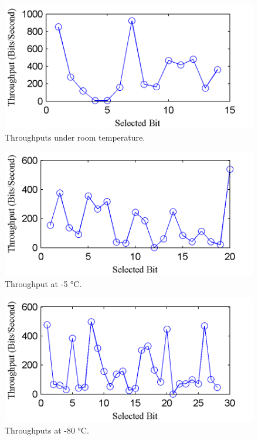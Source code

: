 \begin{figure}
\begin{center} 
\includegraphics[width=\mywidth]{figs/throughput_room_temp.png} 
\caption{Throughputs under room temperature.}
\label{fig:throughput_room_temp} 
\vspace{-0.1in}
\end{center} 
\end{figure} 

\begin{figure}
\begin{center} 
\includegraphics[width=\mywidth]{figs/throughput_m5_temp.png} 
\caption{Throughput at -5 °C.}
\label{fig:throughput_m5_temp} 
\vspace{-0.1in}
\end{center} 
\end{figure} 

\begin{figure}
\begin{center} 
\includegraphics[width=\mywidth]{figs/throughput_m80_temp.png} 
\caption{Throughputs at -80 °C.}
\label{fig:throughput_m80_temp} 
\vspace{-0.1in}
\end{center} 
\end{figure} 

